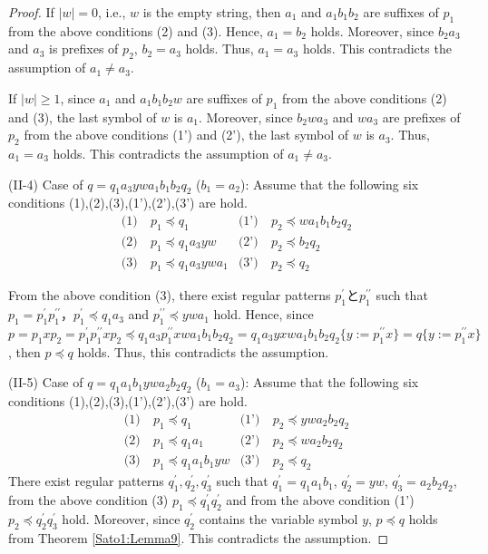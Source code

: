 \begin{proof}
If $|w|=0$, i.e., $w$ is the empty string, then $a_{1}$ and $a_{1}b_{1}b_{2}$ are suffixes of $p_{1}$ from the above conditions (2) and (3).
Hence, $a_{1}=b_{2}$ holds.
Moreover, since $b_{2}a_{3}$ and $a_{3}$ is prefixes of $p_{2}$, $b_{2}=a_{3}$ holds.
Thus, $a_{1}=a_{3}$ holds.
This contradicts the assumption of $a_{1} \ne a_{3}$.

If $|w| \ge 1$, since $a_{1}$ and $a_{1}b_{1}b_{2}w$ are suffixes of $p_{1}$ from the above conditions (2) and (3),
the last symbol of $w$ is $a_{1}$.
Moreover, since $b_{2}wa_{3}$ and $wa_{3}$ are prefixes of $p_{2}$ from the above conditions (1') and (2'),
the last symbol of $w$ is $a_{3}$.
Thus, $a_{1}=a_{3}$ holds.
This contradicts the assumption of $a_{1} \ne a_{3}$.
\smallskip

\noindent
(II-4) Case of $q=q_{1}a_{3}ywa_{1}b_{1}b_{2}q_{2}$ ($b_{1}=a_{2}$):
Assume that the following six conditions (1),(2),(3),(1'),(2'),(3') are hold.
\begin{align*}
\textrm{(1)}~& p_{1} \preceq q_{1} & \textrm{(1')}~& p_{2} \preceq wa_{1}b_{1}b_{2}q_{2} \\
\textrm{(2)}~& p_{1} \preceq q_{1}a_{3}yw & \textrm{(2')}~& p_{2} \preceq b_{2}q_{2} \\
\textrm{(3)}~& p_{1} \preceq q_{1}a_{3}ywa_{1} & \textrm{(3')}~& p_{2} \preceq q_{2}
\end{align*}

\noindent
From the above condition (3), there exist regular patterns $p_{1}^{\prime}$と$p_{1}^{\prime\prime}$ such that $p_{1}=p_{1}^{\prime}p_{1}^{\prime\prime}$，$p_{1}^{\prime} \preceq q_{1}a_{3}$ and $p_{1}^{\prime\prime} \preceq ywa_{1}$ hold.
Hence, since $p=p_{1}xp_{2}=p_{1}^{\prime}p_{1}^{\prime\prime}xp_{2}\preceq q_{1}a_{3}p_{1}^{\prime\prime}xwa_{1}b_{1}b_{2}q_{2}=q_{1}a_{3}yxwa_{1}b_{1}b_{2}q_{2}\{ y := p_{1}^{\prime\prime}x \}=q \{ y := p_{1}^{\prime\prime}x \}$, then $p \preceq q$ holds.
Thus, this contradicts the assumption.
\smallskip

\noindent
(II-5) Case of $q=q_{1}a_{1}b_{1}ywa_{2}b_{2}q_{2}$ ($b_{1}=a_{3}$):
Assume that the following six conditions (1),(2),(3),(1'),(2'),(3') are hold.
\begin{align*}
\textrm{(1)}~& p_{1} \preceq q_{1} & \textrm{(1')}~& p_{2} \preceq ywa_{2}b_{2}q_{2} \\
\textrm{(2)}~& p_{1} \preceq q_{1}a_{1} & \textrm{(2')}~& p_{2} \preceq wa_{2}b_{2}q_{2} \\
\textrm{(3)}~& p_{1} \preceq q_{1}a_{1}b_{1}yw & \textrm{(3')}~& p_{2} \preceq q_{2}
\end{align*}
\noindent
There exist regular patterns $q_{1}^{\prime}, q_{2}^{\prime}, q_{3}^{\prime}$ such that $q_{1}^{\prime}=q_{1}a_{1}b_{1}$, $q_{2}^{\prime}=yw$, $q_{3}^{\prime}=a_{2}b_{2}q_{2}$, from the above condition (3) $p_{1} \preceq q_{1}^{\prime}q_{2}^{\prime}$ and from the above condition (1') $p_{2} \preceq q_{2}^{\prime}q_{3}^{\prime}$ hold.
Moreover, since $q_{2}^{\prime}$ contains the variable symbol $y$, $p\preceq q$ holds from Theorem \ref{Sato1:Lemma9}.
This contradicts the assumption.
\end{proof}

